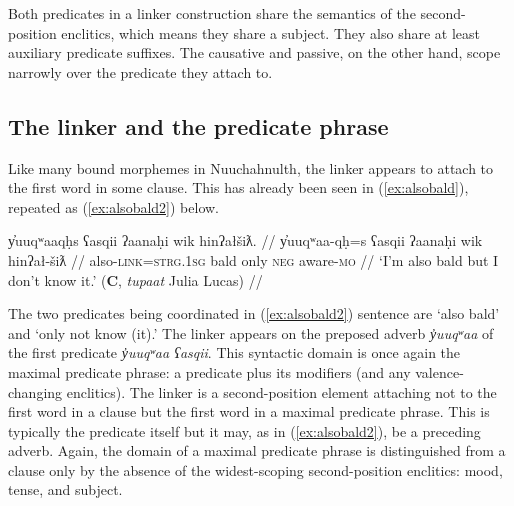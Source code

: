 Both predicates in a linker construction share the semantics of the second-position enclitics, which means they share a subject. They also share at least auxiliary predicate suffixes. The causative and passive, on the other hand, scope narrowly over the predicate they attach to.


\begin{comment}
\ex \label{ex:someonespoke}
\begingl
\glpreamble ʔuušqḥʔaƛ ciqšiƛ.//
\gla ʔuuš-qḥ=ʔaƛ ciq-šiƛ //
\glb some-\textsc{link}=\textsc{now} speak-\textsc{mo} //
\glft `Someone spoke.' //
\endgl
\xe

\ex~ \label{ex:*someonespoke}
\begingl
\glpreamble *ʔuušqḥʔaƛ ciqšiƛḥ.//
\gla *ʔuuš-(q)ḥ=ʔaƛ ciq-šiƛ-(q)ḥ //
\glb *some-\textsc{link}=\textsc{now} speak-\textsc{mo}-\textsc{link} //
\glft Intended: `Someone spoke.' //
\endgl
\xe
\end{comment}


\subsection{The linker and the predicate phrase} \label{ch:link:2p}

Like many bound morphemes in Nuuchahnulth, the linker appears to attach to the first word in some clause. This has already been seen in (\ref{ex:alsobald}), repeated as (\ref{ex:alsobald2}) below.

\ex \label{ex:alsobald2}
\begingl
\glpreamble y̓uuqʷaaqḥs ʕasqii ʔaanaḥi wik hinʔałšiƛ. //
\gla y̓uuqʷaa-qḥ=s ʕasqii ʔaanaḥi wik hinʔał-šiƛ //
\glb also-\textsc{link}=\textsc{strg.1sg} bald only \textsc{neg} aware-\textsc{mo} //
\glft `I'm also bald but I don't know it.' (\textbf{C}, \textit{tupaat} Julia Lucas) //
\endgl
\xe

The two predicates being coordinated in (\ref{ex:alsobald2}) sentence are `also bald' and `only not know (it).' The linker appears on the preposed adverb \textit{y̓uuqʷaa} of the first predicate \textit{y̓uuqʷaa ʕasqii}.	This syntactic domain is once again the maximal predicate phrase: a predicate plus its modifiers (and any valence-changing enclitics). The linker is a second-position element attaching not to the first word in a clause but the first word in a maximal predicate phrase. This is typically the predicate itself but it may, as in (\ref{ex:alsobald2}), be a preceding adverb. Again, the domain of a maximal predicate phrase is distinguished from a clause only by the absence of the widest-scoping second-position enclitics: mood, tense, and subject.

